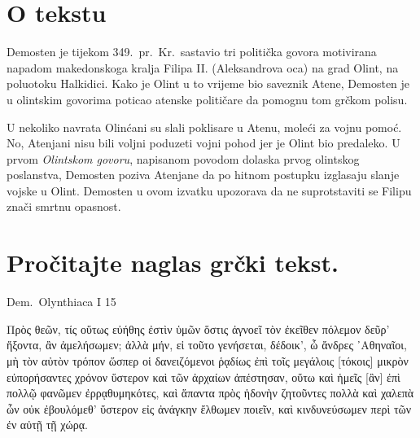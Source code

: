 


\section*{O tekstu}

Demosten je tijekom 349.~pr.~Kr.\ sastavio tri politička govora motivirana napadom makedonskoga kralja Filipa II. (Aleksandrova oca) na grad Olint, na poluotoku Halkidici. Kako je Olint u to vrijeme bio saveznik Atene, Demosten je u olintskim govorima poticao atenske političare da pomognu tom grčkom polisu.

U nekoliko navrata Olinćani su slali poklisare u Atenu, moleći za vojnu pomoć. No, Atenjani nisu bili voljni poduzeti vojni pohod jer je Olint bio predaleko. U prvom \textit{Olintskom govoru}, napisanom povodom dolaska prvog olintskog poslanstva, Demosten poziva Atenjane da po hitnom postupku izglasaju slanje vojske u Olint. Demosten u ovom izvatku upozorava da ne suprotstaviti se Filipu znači smrtnu opasnost.


\section*{Pročitajte naglas grčki tekst.}

Dem.\ Olynthiaca I 15

\medskip

{\large
\begin{greek}
\noindent Πρὸς θεῶν, τίς οὕτως εὐήθης ἐστὶν ὑμῶν ὅστις ἀγνοεῖ τὸν ἐκεῖθεν πόλεμον δεῦρ'  ἥξοντα, ἂν ἀμελήσωμεν; ἀλλὰ μήν, εἰ τοῦτο γενήσεται, δέδοικ', ὦ ἄνδρες ᾿Αθηναῖοι, μὴ τὸν αὐτὸν τρόπον ὥσπερ οἱ δανειζόμενοι ῥᾳδίως ἐπὶ τοῖς μεγάλοις [τόκοις] μικρὸν εὐπορήσαντες χρόνον ὕστερον καὶ τῶν ἀρχαίων ἀπέστησαν, οὕτω καὶ ἡμεῖς [ἂν] ἐπὶ πολλῷ φανῶμεν ἐρρᾳθυμηκότες, καὶ ἅπαντα πρὸς ἡδονὴν ζητοῦντες πολλὰ καὶ χαλεπὰ ὧν οὐκ ἐβουλόμεθ' ὕστερον εἰς ἀνάγκην ἔλθωμεν ποιεῖν, καὶ κινδυνεύσωμεν περὶ τῶν ἐν αὐτῇ τῇ χώρᾳ.

\end{greek}
}

